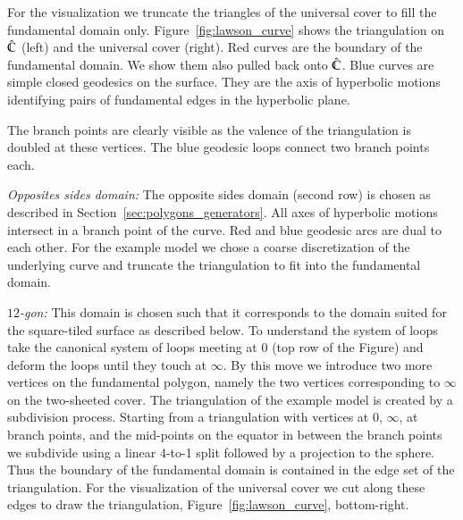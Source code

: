 \documentclass[Thesis]{subfiles}
\begin{document}
 For the visualization we truncate the triangles of the universal cover to fill the fundamental domain only.
 Figure~\ref{fig:lawson_curve} shows the triangulation on $\hat {\mathbb C}$ (left) and the universal cover (right).
 Red curves are the boundary of the fundamental domain.
 We show them also pulled back onto $\hat {\mathbb C}$. Blue curves are simple closed geodesics on the surface.
 They are the axis of hyperbolic motions identifying pairs of fundamental edges in the hyperbolic plane.

 The branch points are clearly visible as the valence of the triangulation is doubled at these vertices.
 The blue geodesic loops connect two branch points each.

 \textit{Opposites sides domain:}
 The opposite sides domain (second row) is chosen as described in Section~\ref{sec:polygons_generators}.
 All axes of hyperbolic motions intersect in a branch point of the curve.
 Red and blue geodesic arcs are dual to each other.
 For the example model we chose a coarse discretization of the underlying curve and truncate the triangulation to fit into the fundamental domain.

 \textit{$12$-gon:}
This domain is chosen such that it corresponds to the domain suited for the square-tiled surface as described below.
To understand the system of loops take the canonical system of loops meeting at $0$ (top row of the Figure) and deform the loops until they touch at $\infty$.
 By this move we introduce two more vertices on the fundamental polygon, namely the two vertices corresponding to $\infty$ on the two-sheeted cover.
 The triangulation of the example model is created by a subdivision process.
 Starting from  a triangulation with vertices at $0$, $\infty$, at branch points, and the mid-points on the equator in between the branch points we subdivide using a linear 4-to-1 split followed by a projection to the sphere. Thus the boundary of the fundamental domain is contained in the edge set of the triangulation. For the visualization of the universal cover we cut along these edges to draw the triangulation, Figure~\ref{fig:lawson_curve}, bottom-right.

\end{document}
